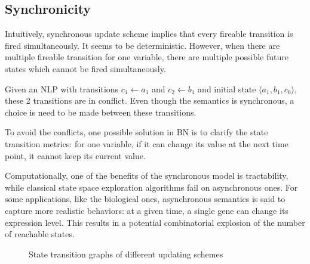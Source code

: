 \subsection{Synchronicity}
Intuitively, synchronous update scheme implies that every fireable transition is fired simultaneously.
It seems to be deterministic. 
However, when there are multiple fireable transition for one variable, there are multiple possible future states which cannot be fired simultaneously.
\begin{example}
Given an NLP with transitions $c_1\gets a_1$ and $c_2\gets b_1$ and initial state $\langle a_1, b_1, c_0\rangle$, these 2 transitions are in conflict.
Even though the semantics is synchronous, a choice is need to be made between these transitions.
\end{example}

To avoid the conflicts, one possible solution in BN is to clarify the state transition metrics:
for one variable, if it can change its value at the next time point, it cannot keep its current value.

Computationally, one of the benefits of the synchronous model is tractability, while classical state space exploration algorithms fail on asynchronous ones.
For some applications, like the biological ones, asynchronous semantics is said to capture more realistic behaviors: at a given time, a single gene can change its expression level.
This results in a potential combinatorial explosion of the number of reachable states.

\begin{figure}[ht]
\caption[Update schemes]{State transition graphs of different updating schemes}
\end{figure}
